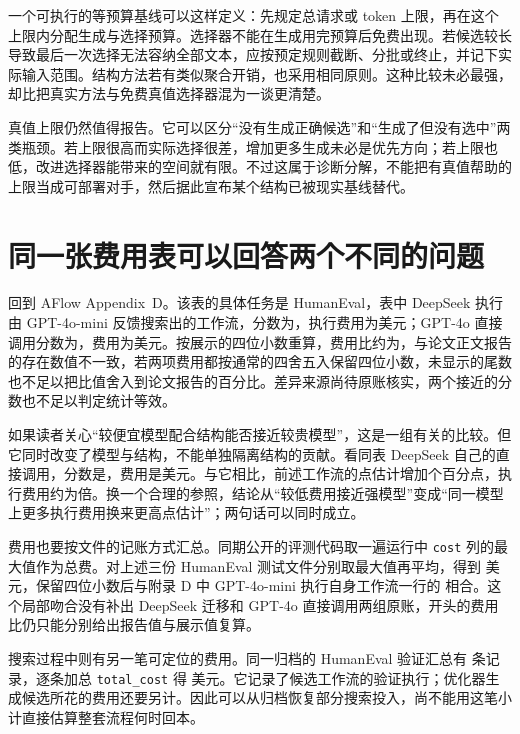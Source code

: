 一个可执行的等预算基线可以这样定义：先规定总请求或 token 上限，再在这个上限内分配生成与选择预算。选择器不能在生成用完预算后免费出现。若候选较长导致最后一次选择无法容纳全部文本，应按预定规则截断、分批或终止，并记下实际输入范围。结构方法若有类似聚合开销，也采用相同原则。这种比较未必最强，却比把真实方法与免费真值选择器混为一谈更清楚。

真值上限仍然值得报告。它可以区分“没有生成正确候选”和“生成了但没有选中”两类瓶颈。若上限很高而实际选择很差，增加更多生成未必是优先方向；若上限也低，改进选择器能带来的空间就有限。不过这属于诊断分解，不能把有真值帮助的上限当成可部署对手，然后据此宣布某个结构已被现实基线替代。

\section{同一张费用表可以回答两个不同的问题}
\label{sec:ch09-costcomparison}

回到 AFlow Appendix~D。该表的具体任务是 HumanEval，表中 DeepSeek 执行由 GPT-4o-mini 反馈搜索出的工作流，分数为，执行费用为美元；GPT-4o 直接调用分数为，费用为美元\cite{aflow-2410}。按展示的四位小数重算，费用比约为，与论文正文报告的存在数值不一致，若两项费用都按通常的四舍五入保留四位小数，未显示的尾数也不足以把比值舍入到论文报告的百分比。差异来源尚待原账核实，两个接近的分数也不足以判定统计等效。

如果读者关心“较便宜模型配合结构能否接近较贵模型”，这是一组有关的比较。但它同时改变了模型与结构，不能单独隔离结构的贡献。看同表 DeepSeek 自己的直接调用，分数是，费用是美元\cite{aflow-2410}。与它相比，前述工作流的点估计增加个百分点，执行费用约为倍。换一个合理的参照，结论从“较低费用接近强模型”变成“同一模型上更多执行费用换来更高点估计”；两句话可以同时成立。

费用也要按文件的记账方式汇总。同期公开的评测代码取一遍运行中 \texttt{cost} 列的最大值作为总费\cite{aflow-metagpt-2024}。对上述三份 HumanEval 测试文件分别取最大值再平均，得到  美元，保留四位小数后与附录 D 中 GPT-4o-mini 执行自身工作流一行的  相合。这个局部吻合没有补出 DeepSeek 迁移和 GPT-4o 直接调用两组原账，开头的费用比仍只能分别给出报告值与展示值复算。

搜索过程中则有另一笔可定位的费用。同一归档的 HumanEval 验证汇总有  条记录，逐条加总 \texttt{total\_cost} 得  美元。它记录了候选工作流的验证执行；优化器生成候选所花的费用还要另计\cite{aflow-code-2025,aflow-metagpt-2024}。因此可以从归档恢复部分搜索投入，尚不能用这笔小计直接估算整套流程何时回本。

